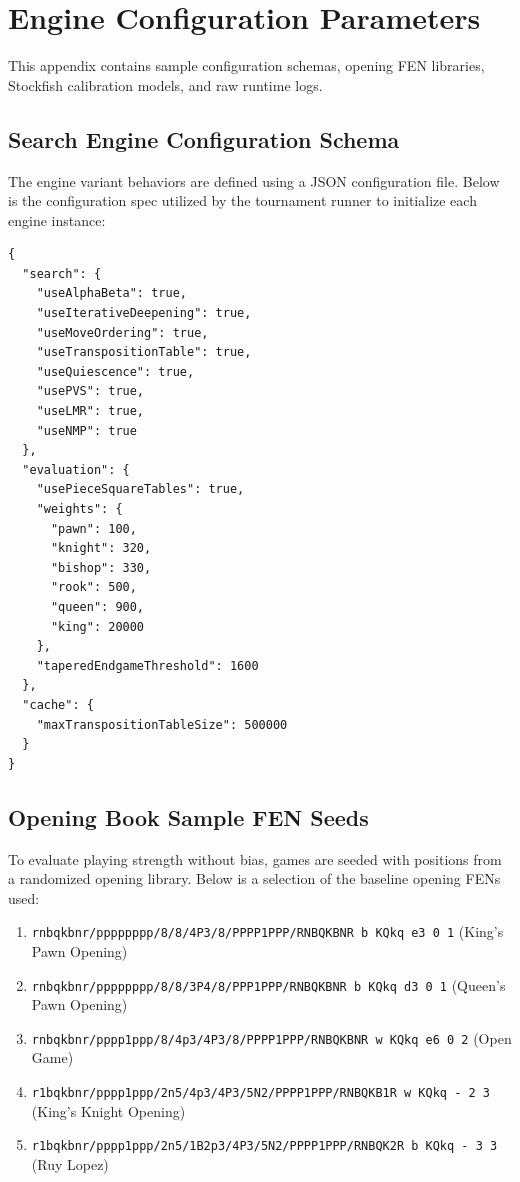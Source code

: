\chapter{Engine Configuration Parameters}
\label{app:configs}

This appendix contains sample configuration schemas, opening FEN libraries, Stockfish calibration models, and raw runtime logs.


\section{Search Engine Configuration Schema}
The engine variant behaviors are defined using a JSON configuration file. Below is the configuration spec utilized by the tournament runner to initialize each engine instance:
\begin{verbatim}
{
  "search": {
    "useAlphaBeta": true,
    "useIterativeDeepening": true,
    "useMoveOrdering": true,
    "useTranspositionTable": true,
    "useQuiescence": true,
    "usePVS": true,
    "useLMR": true,
    "useNMP": true
  },
  "evaluation": {
    "usePieceSquareTables": true,
    "weights": {
      "pawn": 100,
      "knight": 320,
      "bishop": 330,
      "rook": 500,
      "queen": 900,
      "king": 20000
    },
    "taperedEndgameThreshold": 1600
  },
  "cache": {
    "maxTranspositionTableSize": 500000
  }
}
\end{verbatim}

\section{Opening Book Sample FEN Seeds}
To evaluate playing strength without bias, games are seeded with positions from a randomized opening library. Below is a selection of the baseline opening FENs used:
\begin{enumerate}
    \item \texttt{rnbqkbnr/pppppppp/8/8/4P3/8/PPPP1PPP/RNBQKBNR b KQkq e3 0 1} (King's Pawn Opening)
    \item \texttt{rnbqkbnr/pppppppp/8/8/3P4/8/PPP1PPP/RNBQKBNR b KQkq d3 0 1} (Queen's Pawn Opening)
    \item \texttt{rnbqkbnr/pppp1ppp/8/4p3/4P3/8/PPPP1PPP/RNBQKBNR w KQkq e6 0 2} (Open Game)
    \item \texttt{r1bqkbnr/pppp1ppp/2n5/4p3/4P3/5N2/PPPP1PPP/RNBQKB1R w KQkq - 2 3} (King's Knight Opening)
    \item \texttt{r1bqkbnr/pppp1ppp/2n5/1B2p3/4P3/5N2/PPPP1PPP/RNBQK2R b KQkq - 3 3} (Ruy Lopez)
\end{enumerate}

